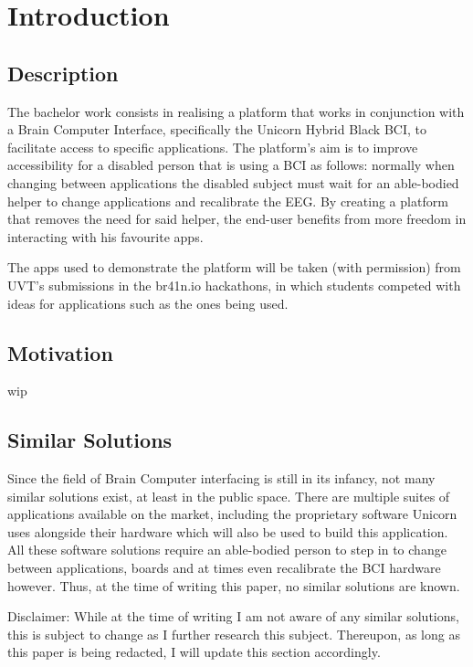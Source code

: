 
\chapter{Introduction}\label{cap:intro}

\section{Description}\label{sect:description}
\hspace{\parindent} The bachelor work consists in realising a platform that works in conjunction with a Brain Computer Interface, specifically the Unicorn Hybrid Black BCI\cite{Unicorn_Technology}, to facilitate access to specific applications. The platform's aim is to improve accessibility for a disabled person that is using a BCI as follows: normally when changing between applications the disabled subject must wait for an able-bodied helper to change applications and recalibrate the EEG. By creating a platform that removes the need for said helper, the end-user benefits from more freedom in interacting with his favourite apps. 

\vspace*{2mm}
\hspace{\parindent} The apps used to demonstrate the platform will be taken (with permission) from UVT's submissions in the br41n.io hackathons, in which students competed with ideas for applications such as the ones being used.


\section{Motivation}\label{sect:motivation}
\hspace{\parindent} wip


\section{Similar Solutions}\label{sect:similar solutions}
\hspace{\parindent} Since the field of Brain Computer interfacing is still in its infancy, not many similar solutions exist, at least in the public space. There are multiple suites of applications available on the market, including the proprietary software Unicorn uses alongside their hardware which will also be used to build this application. All these software solutions require an able-bodied person to step in to change between applications, boards and at times even recalibrate the BCI hardware however. Thus, at the time of writing this paper, no similar solutions are known.

\hspace{\parindent} Disclaimer: While at the time of writing I am not aware of any similar solutions, this is subject to change as I further research this subject. Thereupon, as long as this paper is being redacted, I will update this section accordingly.
